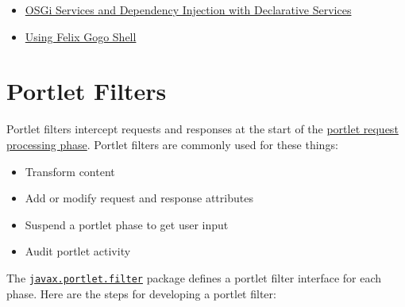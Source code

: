 \begin{itemize}
\tightlist
\item
  \href{/docs/7-2/frameworks/-/knowledge_base/f/declarative-services}{OSGi
  Services and Dependency Injection with Declarative Services}
\item
  \href{/docs/7-2/customization/-/knowledge_base/c/using-the-felix-gogo-shell}{Using
  Felix Gogo Shell}
\end{itemize}

\chapter{Portlet Filters}\label{portlet-filters}

Portlet filters intercept requests and responses at the start of the
\href{/docs/7-2/frameworks/-/knowledge_base/f/portlets}{portlet request
processing phase}. Portlet filters are commonly used for these things:

\begin{itemize}
\tightlist
\item
  Transform content
\item
  Add or modify request and response attributes
\item
  Suspend a portlet phase to get user input
\item
  Audit portlet activity
\end{itemize}

The
\href{http://docs.liferay.com/portlet-api/3.0/javadocs/javax/portlet/filter/package-frame.html}{\texttt{javax.portlet.filter}}
package defines a portlet filter interface for each phase. Here are the
steps for developing a portlet filter:

